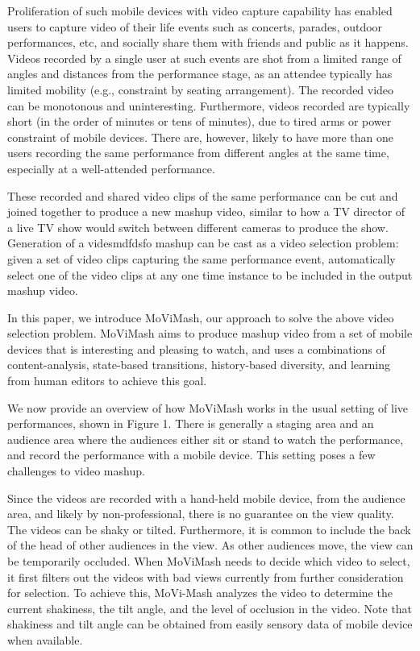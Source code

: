 \documentclass{sig-alternate-05-2015}
\begin{document}
Proliferation of such mobile devices with video capture capability has enabled users to capture video of their life events such as concerts, parades, outdoor performances, etc, and socially share them with friends and public as it happens. Videos recorded by a single user at such events are shot from a limited range of angles and distances from the performance stage, as an attendee typically has limited mobility (e.g., constraint by seating arrangement). The recorded video can be monotonous and uninteresting. Furthermore, videos recorded are typically short (in the order of minutes or tens of minutes), due to tired arms or power constraint of mobile devices. There are, however, likely to have more than one users recording the same performance from different angles at the same time, especially at a well-attended performance.

These recorded and shared video clips of the same performance can be cut and joined together to produce a new mashup video, similar to how a TV director of a live TV show would switch between different cameras to produce the show. Generation of a videsmdfdsfo mashup can be cast as a video selection problem: given a set of video clips capturing the same performance event, automatically select one of the video clips at any one time instance to be included in the output mashup video.

In this paper, we introduce MoViMash, our approach to solve the above video selection problem. MoViMash aims to produce mashup video from a set of mobile devices that is interesting and pleasing to watch, and uses a combinations of content-analysis, state-based transitions, history-based diversity, and learning from human editors to achieve this goal.

We now provide an overview of how MoViMash works in the usual setting of live performances, shown in Figure 1. There is generally a staging area and an audience area where the audiences either sit or stand to watch the performance, and record the performance with a mobile device. This setting poses a few challenges to video mashup.

Since the videos are recorded with a hand-held mobile device, from the audience area, and likely by non-professional, there is no guarantee on the view quality. The videos can be shaky or tilted. Furthermore, it is common to include the back of the head of other audiences in the view. As other audiences move, the view can be temporarily occluded. When MoViMash needs to decide which video to select, it first filters out the videos with bad views currently from further consideration for selection. To achieve this, MoVi-Mash analyzes the video to determine the current shakiness, the tilt angle, and the level of occlusion in the video. Note that shakiness and tilt angle can be obtained from easily sensory data of mobile device when available.
\end{document}
